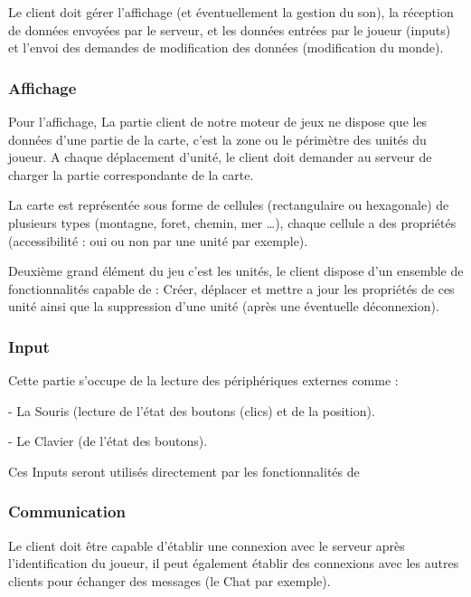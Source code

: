 \documentclass[a4paper,10pt]{report}
\begin{document}
        Le client doit gérer l'affichage (et éventuellement la gestion du son), la réception de données envoyées par le serveur, et les données entrées par le joueur (inputs) et l'envoi des demandes de modification des données (modification du monde).

        \subsubsection{Affichage}

          Pour l’affichage, La partie client de notre moteur de jeux ne dispose que les données d’une partie de la carte, c’est la zone ou le périmètre des unités du joueur. A chaque déplacement d’unité, le client doit demander au serveur de charger la partie  correspondante de la carte.

          La carte est représentée sous forme de cellules (rectangulaire ou hexagonale) de plusieurs types (montagne, foret, chemin, mer …), chaque cellule a des propriétés (accessibilité : oui ou non par une unité par exemple).

          Deuxième grand élément du jeu c’est les unités, le client dispose d’un ensemble de fonctionnalités capable de : Créer, déplacer et mettre a jour les propriétés de ces unité ainsi que la suppression d’une unité (après une éventuelle déconnexion).

        \subsubsection{Input}

          Cette partie s'occupe de la lecture des périphériques externes comme :

          - La Souris (lecture de l'état des boutons (clics) et de la position).

          - Le Clavier (de l'état des boutons).

          Ces Inputs seront utilisés directement par les fonctionnalités de

        \subsubsection{Communication}

          Le client doit être capable d’établir une connexion avec le serveur après l’identification du joueur, il peut également établir des connexions avec les autres clients pour échanger des messages (le Chat par exemple).
\end{document}
